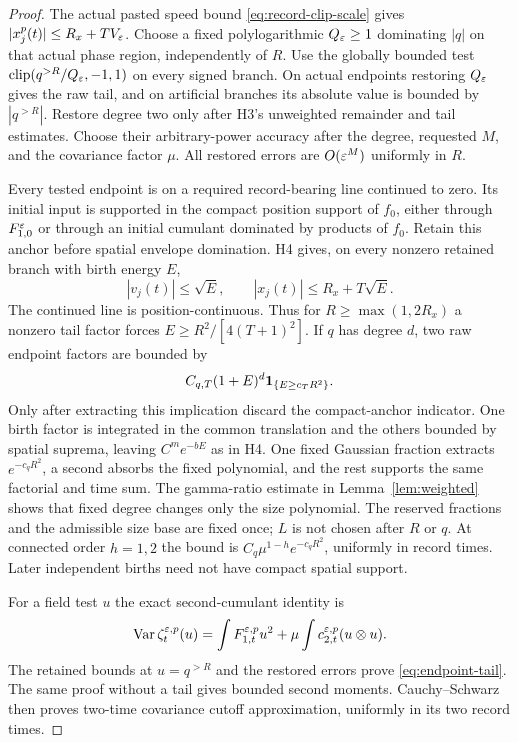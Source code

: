 \begin{proof}
The actual pasted speed bound \eqref{eq:record-clip-scale} gives
$|x_j^p(t)|\le R_x+TV_\varepsilon$. Choose a fixed polylogarithmic
$Q_\varepsilon\ge1$ dominating $|q|$ on that actual phase region, independently
of $R$. Use the globally bounded test
$\operatorname{clip}(q^{>R}/Q_\varepsilon,-1,1)$ on every signed branch. On actual endpoints
restoring $Q_\varepsilon$ gives the raw tail, and on artificial branches its
absolute value is bounded by $|q^{>R}|$. Restore degree two only after
H3's unweighted remainder and tail estimates. Choose their arbitrary-power
accuracy after the degree, requested $M$, and the covariance factor $\mu$.
All restored errors are $O(\varepsilon^M)$ uniformly in $R$.

Every tested endpoint is on a required record-bearing line continued to zero.
Its initial input is supported in the compact position support of $f_0$,
either through $F_{1,0}^\varepsilon$ or through an initial cumulant dominated by
products of $f_0$. Retain this anchor before spatial envelope domination.
H4 gives, on every nonzero retained branch with birth energy $E$,
\[
 |v_j(t)|\le\sqrt E,\qquad |x_j(t)|\le R_x+T\sqrt E.
\]
The continued line is position-continuous. Thus for $R\ge\max(1,2R_x)$
a nonzero tail factor forces
$E\ge R^2/[4(T+1)^2]$.
If $q$ has degree $d$, two raw endpoint factors are bounded by
\[
 C_{q,T}(1+E)^d\mathbf 1_{\{E\ge c_TR^2\}}.
\]
Only after extracting this implication discard the compact-anchor indicator.
One birth factor is integrated in the common translation and the others
bounded by spatial suprema, leaving $C^m e^{-bE}$ as in H4. One fixed
Gaussian fraction extracts $e^{-c_qR^2}$, a second absorbs the fixed
polynomial, and the rest supports the same factorial and time sum. The
gamma-ratio estimate in Lemma~\ref{lem:weighted} shows that fixed degree
changes only the size polynomial. The reserved fractions and the admissible
size base are fixed once; $L$ is not chosen after $R$ or $q$.
At connected order $h=1,2$ the bound is
$C_q\mu^{1-h}e^{-c_qR^2}$, uniformly in record times. Later independent
births need not have compact spatial support.

For a field test $u$ the exact second-cumulant identity is
\[
 \operatorname{Var}\zeta_t^{\varepsilon,p}(u)
       =\int F_{1,t}^{\varepsilon,p}u^2
                          +\mu\int c_{2,t}^{\varepsilon,p}(u\otimes u).
\]
The retained bounds at $u=q^{>R}$ and the restored errors prove
\eqref{eq:endpoint-tail}. The same proof without a tail gives bounded
second moments. Cauchy--Schwarz then proves two-time covariance cutoff
approximation, uniformly in its two record times.
\end{proof}

